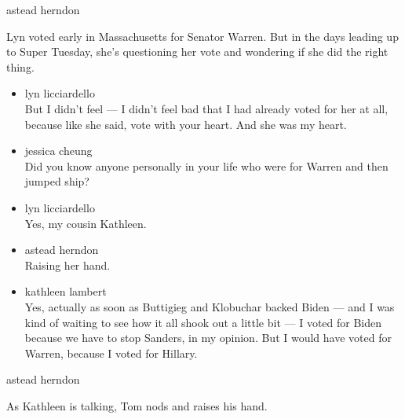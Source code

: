astead herndon

Lyn voted early in Massachusetts for Senator Warren. But in the days
leading up to Super Tuesday, she's questioning her vote and wondering if
she did the right thing.

\begin{itemize}
\item
  lyn licciardello\\
  But I didn't feel --- I didn't feel bad that I had already voted for
  her at all, because like she said, vote with your heart. And she was
  my heart.
\item
  jessica cheung\\
  Did you know anyone personally in your life who were for Warren and
  then jumped ship?
\item
  lyn licciardello\\
  Yes, my cousin Kathleen.
\item
  astead herndon\\
  Raising her hand.
\item
  kathleen lambert\\
  Yes, actually as soon as Buttigieg and Klobuchar backed Biden --- and
  I was kind of waiting to see how it all shook out a little bit --- I
  voted for Biden because we have to stop Sanders, in my opinion. But I
  would have voted for Warren, because I voted for Hillary.
\end{itemize}

astead herndon

As Kathleen is talking, Tom nods and raises his hand.

